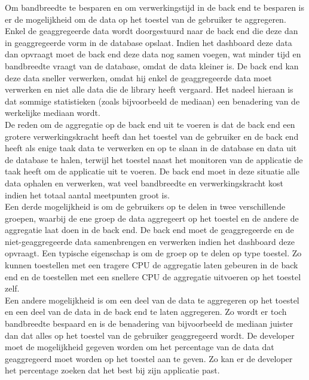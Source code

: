 Om bandbreedte te besparen en om verwerkingstijd in de back end te besparen is er de mogelijkheid om de data op het toestel van de gebruiker te aggregeren. Enkel de geaggregeerde data wordt doorgestuurd naar de back end die deze dan in geaggregeerde vorm in de database opslaat. Indien het dashboard deze data dan opvraagt moet de back end deze data nog samen voegen, wat minder tijd en bandbreedte vraagt van de database, omdat de data kleiner is. De back end kan deze data sneller verwerken, omdat hij enkel de geaggregeerde data moet verwerken en niet alle data die de library heeft vergaard. Het nadeel hieraan is dat sommige statistieken (zoals bijvoorbeeld de mediaan) een benadering van de werkelijke mediaan wordt. \\

De reden om de aggregatie op de back end uit te voeren is dat de back end een grotere verwerkingskracht heeft dan het toestel van de gebruiker en de back end heeft als enige taak data te verwerken en op te slaan in de database en data uit de database te halen, terwijl het toestel naast het monitoren van de applicatie de taak heeft om de applicatie uit te voeren. De back end moet in deze situatie alle data ophalen en verwerken, wat veel bandbreedte en verwerkingskracht kost indien het totaal aantal meetpunten groot is. \\

Een derde mogelijkheid is om de gebruikers op te delen in twee verschillende groepen, waarbij de ene groep de data aggregeert op het toestel en de andere de aggregatie laat doen in de back end. De back end moet de geaggregeerde en de niet-geaggregeerde data samenbrengen en verwerken indien het dashboard deze opvraagt. Een typische eigenschap is om de groep op te delen op type toestel. Zo kunnen toestellen met een tragere CPU de aggregatie laten gebeuren in de back end en de toestellen met een snellere CPU de aggregatie uitvoeren op het toestel zelf. \\

Een andere mogelijkheid is om een deel van de data te aggregeren op het toestel en een deel van de data in de back end te laten aggregeren. Zo wordt er toch bandbreedte bespaard en is de benadering van bijvoorbeeld de mediaan juister dan dat alles op het toestel van de gebruiker geaggregeerd wordt. De developer moet de mogelijkheid gegeven worden om het percentage van de data dat geaggregeerd moet worden op het toestel aan te geven. Zo kan er de developer het percentage zoeken dat het best bij zijn applicatie past.\\ 

